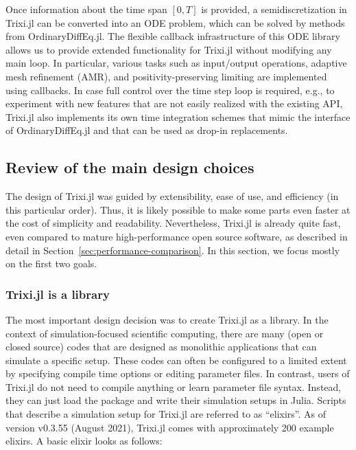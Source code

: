 \documentclass[hidelinks]{juliacon} %
\newcommand{\trixi}{Trixi.jl\xspace}
\begin{document}
Once information about the time span $[0, T]$ is provided, a semidiscretization
in \trixi can be converted into an ODE problem, which can be solved by methods
from OrdinaryDiffEq.jl. The flexible callback infrastructure of this ODE library
allows us to provide extended functionality for \trixi without modifying any
main loop. In particular, various tasks such as input/output operations, adaptive
mesh refinement (AMR), and positivity-preserving limiting are implemented using
callbacks. In case full control over the time step loop is required, e.g., to experiment with new
features that are not easily realized with the existing API, \trixi also implements its own time
integration schemes that mimic the interface of OrdinaryDiffEq.jl and that can be used as drop-in
replacements.


\subsection{Review of the main design choices}

The design of \trixi was guided by extensibility, ease of use, and efficiency
(in this particular order). Thus, it is likely possible to make some parts even
faster at the cost of simplicity and readability. Nevertheless, \trixi is already quite
fast, even compared to mature high-performance open source software,
as described in detail in Section~\ref{sec:performance-comparison}. In this
section, we focus mostly on the first two goals.

\subsubsection{Trixi.jl is a library}

The most important design decision was to create \trixi as a library. In the
context of simulation-focused scientific computing, there are many (open
or closed source) codes that are designed as monolithic applications that can
simulate a specific setup. These codes can often be configured to a limited extent
by specifying compile time options or editing parameter files. In contrast, users of
\trixi do not need to compile anything or learn parameter file syntax. Instead, they can
just load the package and write their simulation setups in Julia. Scripts that describe
a simulation setup for \trixi are referred to as ``elixirs''. As of version
v0.3.55 (August 2021), \trixi comes with approximately 200 example elixirs. A basic elixir
looks as follows:
\end{document}
